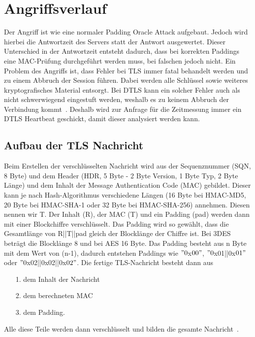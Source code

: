 \documentclass[a4paper,10pt]{scrartcl}
\begin{document}
    \section{Angriffsverlauf}\label{sec:angriffsverlauf}
    Der Angriff ist wie eine normaler Padding Oracle Attack aufgebaut.
    Jedoch wird hierbei die Antwortzeit des Servers statt der Antwort ausgewertet.
    Dieser Unterschied in der Antwortzeit entsteht dadurch, dass bei korrekten Paddings eine MAC-Prüfung durchgeführt werden muss, bei falschen jedoch nicht.
    Ein Problem des Angriffs ist, dass Fehler bei TLS immer fatal behandelt werden und zu einem Abbruch der Session führen.
    Dabei werden alle Schlüssel sowie weiteres kryptografisches Material entsorgt.
    Bei DTLS kann ein solcher Fehler auch als nicht schwerwiegend eingestuft werden, weshalb es zu keinem Abbruch der Verbindung kommt~\cite[S.5]{AlFardan2013}.
    Deshalb wird zur Anfrage für die Zeitmessung immer ein DTLS Heartbeat geschickt, damit dieser analysiert werden kann.

    \subsection{Aufbau der TLS Nachricht}\label{subsec:aufbauder-tls-nachricht}
    Beim Erstellen der verschlüsselten Nachricht wird aus der Sequenznummer (SQN, 8 Byte) und dem Header (HDR, 5 Byte - 2 Byte Version, 1 Byte Typ, 2 Byte Länge) und dem Inhalt der Message Authentication Code (MAC) gebildet.
    Dieser kann je nach Hash-Algorithmus verschiedene Längen (16 Byte bei HMAC-MD5, 20 Byte bei HMAC-SHA-1 oder 32 Byte bei HMAC-SHA-256) annehmen.
    Diesen nennen wir T\@.
    Der Inhalt (R), der MAC (T) und ein Padding (pad) werden dann mit einer Blockchiffre verschlüsselt.
    Das Padding wird so gewählt, dass die Gesamtlänge von R||T||pad gleich der Blocklänge der Chiffre ist.
    Bei 3DES beträgt die Blocklänge 8 und bei AES 16 Byte.
    Das Padding besteht aus n Byte mit dem Wert von (n-1), dadurch entstehen Paddings wie \("0\)x\(00"\), \("0\)x01||0x\(01"\) oder \("0\)x02||0x02||0x\(02"\).
    Die fertige TLS-Nachricht besteht dann aus
    \begin{itemize}
        \item [1.] dem Inhalt der Nachricht
        \item [2.] dem berechneten MAC
        \item [3.] dem Padding.
    \end{itemize}
    Alle diese Teile werden dann verschlüsselt und bilden die gesamte Nachricht~\cite[S.4]{AlFardan2013}.
\end{document}
